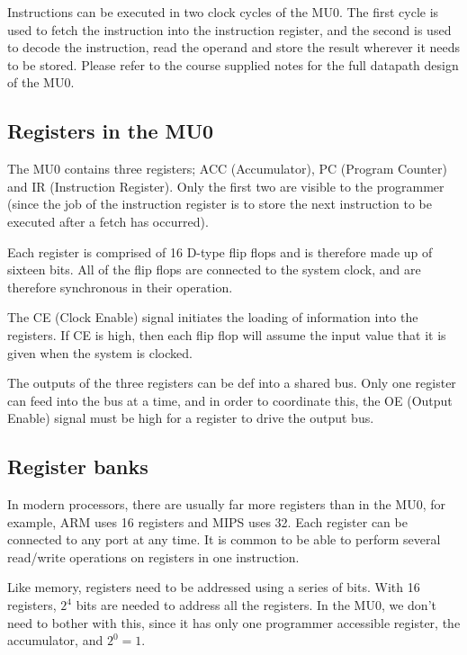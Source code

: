 \documentclass{article}
\begin{document}
Instructions can be executed in two clock cycles of the MU0. The first cycle is
used to fetch the instruction into the instruction register, and the second is
used to decode the instruction, read the operand and store the result wherever
it needs to be stored. Please refer to the course supplied notes for the full
datapath design of the MU0.

\subsection{Registers in the MU0}

The MU0 contains three registers; ACC (Accumulator), PC (Program Counter) and IR
(Instruction Register). Only the first two are visible to the programmer (since
the job of the instruction register is to store the next instruction to be
executed after a fetch has occurred).

Each register is comprised of 16 D-type flip flops and is therefore made up of
sixteen bits. All of the flip flops are connected to the system clock, and are
therefore synchronous in their operation.

The CE (Clock Enable) signal initiates the loading of information into the
registers. If CE is high, then each flip flop will assume the input value that
it is given when the system is clocked.

The outputs of the three registers can be def into a shared bus. Only one
register can feed into the bus at a time, and in order to coordinate this, the
OE (Output Enable) signal must be high for a register to drive the output bus.

\subsection{Register banks}

In modern processors, there are usually far more registers than in the MU0, for
example, ARM uses 16 registers and MIPS uses 32. Each register can be connected
to any port at any time. It is common to be able to perform several read/write
operations on registers in one instruction.

Like memory, registers need to be addressed using a series of bits. With 16
registers, $2^{4}$ bits are needed to address all the registers. In the MU0, we
don't need to bother with this, since it has only one programmer accessible
register, the accumulator, and $2^0=1$.
\end{document}
